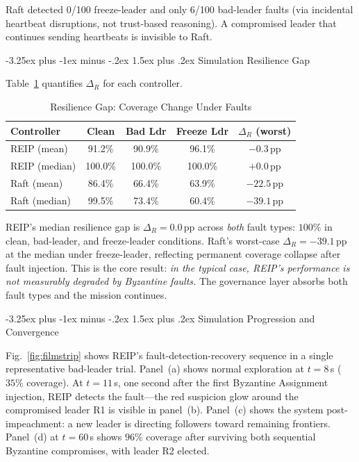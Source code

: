 \documentclass[conference]{IEEEtran}
\makeatletter
\renewcommand{\subsection}{\@startsection{subsection}{2}{\z@}%
  {-3.25ex plus -1ex minus -.2ex}%
  {1.5ex plus .2ex}%
  {\normalfont\normalsize\itshape\centering}}
\makeatother
\begin{document}
Raft detected 0/100 freeze-leader and only 6/100 bad-leader faults (via incidental heartbeat disruptions, not trust-based reasoning). A compromised leader that continues sending heartbeats is invisible to Raft.


\subsection{Simulation Resilience Gap} 

Table~\ref{tab:mr_resilience} quantifies $\Delta_R$ for each controller.

\begin{table}[t]
\centering
\caption{Resilience Gap: Coverage Change Under Faults}
\label{tab:mr_resilience}
\begin{tabular}{@{}lcccc@{}}
\toprule
\textbf{Controller} & \textbf{Clean} & \textbf{Bad Ldr} &
\textbf{Freeze Ldr} & $\Delta_R$ (worst) \\
\midrule
REIP (mean)    & 91.2\%  & 90.9\%  & 96.1\%  & $-0.3\,$pp  \\
REIP (median)  & 100.0\% & 100.0\% & 100.0\% & $+0.0\,$pp  \\
\midrule
Raft (mean)    & 86.4\%  & 66.4\%  & 63.9\%  & $-22.5\,$pp \\
Raft (median)  & 99.5\%  & 73.4\%  & 60.4\%  & $-39.1\,$pp \\
\bottomrule
\end{tabular}
\end{table}

REIP's median resilience gap is $\Delta_R = 0.0\,$pp across \emph{both} fault types: $100\%$ in clean, bad-leader, and freeze-leader conditions. Raft's worst-case $\Delta_R = -39.1\,$pp at the median under freeze-leader, reflecting permanent coverage collapse after fault injection. This is the core result: \emph{in the typical case, REIP's performance is not measurably degraded by Byzantine faults.} The governance layer absorbs both fault types and the mission continues.

\subsection{Simulation Progression and Convergence}

Fig.~\ref{fig:filmstrip} shows REIP's fault-detection-recovery sequence in a single representative bad-leader trial. Panel~(a) shows normal exploration at $t{=}8\,$s ($35\%$ coverage). At $t{=}11\,$s, one second after the first Byzantine Assignment injection, REIP detects the fault---the red suspicion glow around the compromised leader R1 is visible in panel~(b). Panel~(c) shows the system post-impeachment: a new leader is directing followers toward remaining frontiers. Panel~(d) at $t{=}60\,$s shows $96\%$ coverage after surviving both sequential Byzantine compromises, with leader R2 elected.
\end{document}
